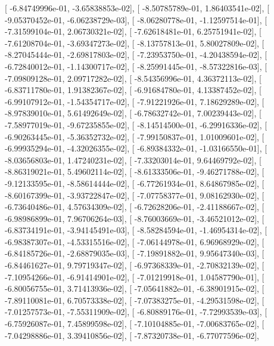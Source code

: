 \documentclass{article}
\begin{document}
       [ -6.84749996e-01,  -3.65838853e-02],
       [ -8.50785789e-01,   1.86403541e-02],
       [ -9.05370452e-01,  -6.06238729e-03],
       [ -8.06280778e-01,  -1.12597514e-01],
       [ -7.31599104e-01,   2.06730321e-02],
       [ -7.62618481e-01,   6.25751941e-02],
       [ -7.61208704e-01,  -3.69347273e-02],
       [ -8.13757813e-01,   5.80027809e-02],
       [ -8.27045444e-01,  -2.69817803e-02],
       [ -7.23953750e-01,  -4.20438594e-02],
       [ -6.72840012e-01,  -1.14300717e-02],
       [ -8.25991445e-01,  -8.57322816e-03],
       [ -7.09809128e-01,   2.09717282e-02],
       [ -8.54356996e-01,   4.36372113e-02],
       [ -6.83711780e-01,   1.91382367e-02],
       [ -6.91684780e-01,   4.13387452e-02],
       [ -6.99107912e-01,  -1.54354717e-02],
       [ -7.91221926e-01,   7.18629289e-02],
       [ -8.97839010e-01,   5.61492649e-02],
       [ -6.78632742e-01,   7.00239443e-02],
       [ -7.58977019e-01,  -9.67235855e-02],
       [ -8.14514500e-01,  -6.29916336e-02],
       [ -6.90263445e-01,  -5.36352732e-02],
       [ -7.99150837e-01,   1.01009601e-02],
       [ -6.99935294e-01,  -4.32026355e-02],
       [ -6.89384332e-01,  -1.03166550e-01],
       [ -8.03656803e-01,   1.47240231e-02],
       [ -7.33203014e-01,   9.64469792e-02],
       [ -8.86319021e-01,   5.49602114e-02],
       [ -8.61333506e-01,  -9.46271788e-02],
       [ -9.12133595e-01,  -8.58614444e-02],
       [ -6.77261934e-01,   8.64867985e-02],
       [ -8.60167399e-01,  -3.93722847e-02],
       [ -7.07758377e-01,   9.08162930e-02],
       [ -6.73640486e-01,   4.57634309e-02],
       [ -6.72628206e-01,  -2.41188667e-02],
       [ -6.98986899e-01,   7.96706264e-03],
       [ -8.76003669e-01,  -3.46521012e-02],
       [ -6.83734191e-01,  -3.94145491e-03],
       [ -8.58284594e-01,  -1.46954314e-02],
       [ -6.98387307e-01,  -4.53315516e-02],
       [ -7.06144978e-01,   6.96968929e-02],
       [ -6.84185726e-01,  -2.68879035e-03],
       [ -7.19891882e-01,   9.95647340e-03],
       [ -6.84461627e-01,   9.79719347e-02],
       [ -6.97368339e-01,  -2.70832139e-02],
       [ -7.10954266e-01,  -6.91414901e-02],
       [ -7.01219918e-01,   1.04587790e-01],
       [ -6.80056755e-01,   3.71413936e-02],
       [ -7.05641882e-01,  -6.38901915e-02],
       [ -7.89110081e-01,   6.70573338e-02],
       [ -7.07383275e-01,  -4.29531598e-02],
       [ -7.01257573e-01,  -7.55311909e-02],
       [ -6.80889176e-01,  -7.72993539e-03],
       [ -6.75926087e-01,   7.45899598e-02],
       [ -7.10104885e-01,  -7.00683765e-02],
       [ -7.04298886e-01,   3.39410856e-02],
       [ -7.87320738e-01,  -6.77077596e-02],
\end{document}
